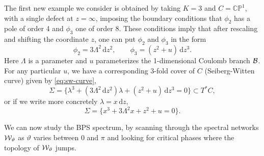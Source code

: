 \documentclass[11pt,a4paper]{article}
\def\IC{\mathbb{C}}
\def\IP{\mathbb{P}}
\def\wnet {{\cal W}}
\def\CB {{\cal B}}
\def\IC{\mathbb{C}}
\def\IP{\mathbb{P}}
\def\CB {{\cal B}}
\def\wnet {{\cal W}}
\def\CB {{\cal B}}
\newcommand\de{{\mathrm{d}}}
\begin{document}
The first new example we consider is obtained by taking $K=3$ and $C = \IC\IP^1$,
with a single defect at $z = \infty$, imposing the boundary conditions
that $\phi_2$ has a pole of order 4 and $\phi_3$ one of order 8.
These conditions imply that after rescaling and shifting the coordinate $z$, one can put
$\phi_2$ and $\phi_3$ in the form
\begin{equation}
 \phi_2 = 3 \Lambda^2 \, \de z^{2}, \qquad \phi_3 = (z^2 + u) \, \de z^{3}.
\end{equation}
Here $\Lambda$ is a parameter and $u$ parameterizes the 1-dimensional Coulomb branch $\CB$.
For any particular $u$, we have a corresponding $3$-fold cover of $C$ (Seiberg-Witten curve) given by \eqref{eq:sw-curve},
\begin{equation}
 \Sigma = \{ \lambda^3 + (3 \Lambda^2 \, \de z^{2}) \lambda + (z^2 + u) \, \de z^{3} = 0 \} \subset T^* C,
\end{equation}
or if we write more concretely $\lambda = x \, \de z$,
\begin{equation} \label{eq:sw-pentagon-1}
 \Sigma = \{ x^3 + 3 \Lambda^2 x + z^2 + u = 0 \}.
\end{equation}

We can now study the BPS spectrum, by scanning through the spectral networks $\wnet_\vartheta$ as $\vartheta$ varies
between $0$ and $\pi$ and looking
for critical phases where the topology of $\wnet_\vartheta$ jumps.
\end{document}
